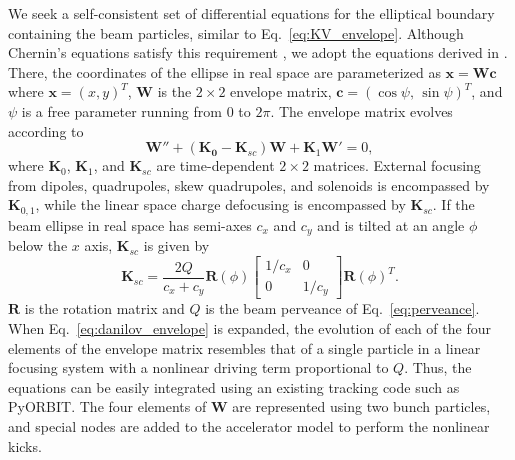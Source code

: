 We seek a self-consistent set of differential equations for the elliptical boundary containing the beam particles, similar to Eq.~\eqref{eq:KV_envelope}. Although Chernin's equations satisfy this requirement \cite{Chernin1988}, we adopt the equations derived in \cite{Danilov2003}. There, the coordinates of the ellipse in real space are parameterized as $\mathbf{x} = \mathbf{W}\mathbf{c}$ where $\mathbf{x} = (x, y)^T$, $\mathbf{W}$ is the $2 \times 2$ envelope matrix, $\mathbf{c} = (\cos\psi, \, \sin\psi)^T$, and $\psi$ is a free parameter running from $0$ to $2\pi$. The envelope matrix evolves according to
%
\begin{equation}\label{eq:danilov_envelope}
    \mathbf{W}'' + \left({\mathbf{K_0} - \mathbf{K}_{sc}}\right)\mathbf{W} + \mathbf{K}_1 \mathbf{W}'= 0,
\end{equation}
%
where $\mathbf{K}_0$, $\mathbf{K}_1$, and $\mathbf{K}_{sc}$ are time-dependent $2 \times 2$ matrices. External focusing from dipoles, quadrupoles, skew quadrupoles, and solenoids is encompassed by $\mathbf{K}_{0, 1}$, while the linear space charge defocusing is encompassed by $\mathbf{K}_{sc}$. If the beam ellipse in real space has semi-axes $c_x$ and $c_y$ and is tilted at an angle $\phi$ below the $x$ axis, $\mathbf{K}_{sc}$ is given by 
%
\begin{equation}
    \mathbf{K}_{sc} = \frac{2Q}{c_x + c_y} 
        \mathbf{R}(\phi) \begin{bmatrix} 1/c_x & 0 \\ 0 & 1/c_y \end{bmatrix} \mathbf{R}(\phi)^T. 
\end{equation}
%
$\mathbf{R}$ is the rotation matrix and $Q$ is the beam perveance of Eq.~\eqref{eq:perveance}. When Eq.~\eqref{eq:danilov_envelope} is expanded, the evolution of each of the four elements of the envelope matrix resembles that of a single particle in a linear focusing system with a nonlinear driving term proportional to $Q$. Thus, the equations can be easily integrated using an existing tracking code such as PyORBIT. The four elements of $\mathbf{W}$ are represented using two bunch particles, and special nodes are added to the accelerator model to perform the nonlinear kicks. 

